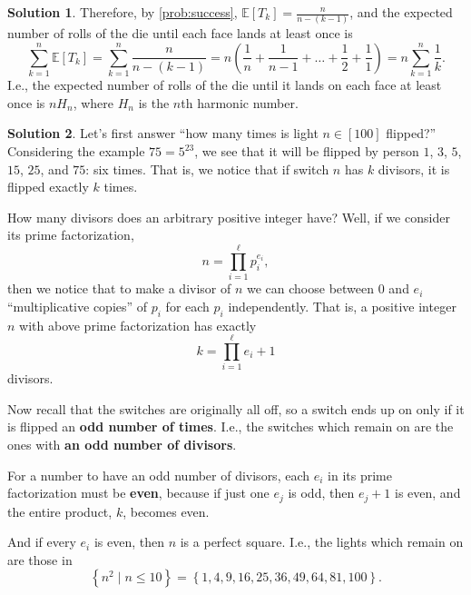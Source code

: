 \documentclass{article}
\theoremstyle{definition}
\newtheorem{sol}{Solution}
\theoremstyle{plain}
\newcommand{\set}[1]{\left\{#1\right\}}
\newcommand{\Exp}[1]{\mathbb{E}\left[#1\right]}
\begin{document}
\begin{sol}
Therefore, by \eqref{prob:success}, $\Exp{T_k} = \frac{n}{n-(k-1)}$, and the expected number of rolls of the die until each face lands at least once is
\[
\sum_{k=1}^{n}\Exp{T_k} = \sum_{k=1}^{n}\frac{n}{n-(k-1)} = n\left(\frac{1}{n} + \frac{1}{n-1} + \dots + \frac{1}{2} + \frac{1}{1}\right) = n\sum_{k=1}^n\frac{1}{k}.
\]
I.e., the expected number of rolls of the die until it lands on each face at least once is $nH_n$, where $H_n$ is the $n$th harmonic number.
\end{sol}

\begin{sol}
Let's first answer ``how many times is light $n \in [100]$ flipped?'' Considering the example $75=5^23$, we see that it will be flipped by person $1$, $3$, $5$, $15$, $25$, and $75$: six times. That is, we notice that if switch $n$ has $k$ divisors, it is flipped exactly $k$ times.

How many divisors does an arbitrary positive integer have? Well, if we consider its prime factorization,
\[
n = \prod_{i = 1}^{\ell}p_i^{e_i},
\]
then we notice that to make a divisor of $n$ we can choose between $0$ and $e_i$ ``multiplicative copies'' of $p_i$ for each $p_i$ independently. That is, a positive integer $n$ with above prime factorization has exactly
\[
k = \prod_{i=1}^{\ell}e_i+1
\]
divisors.

Now recall that the switches are originally all off, so a switch ends up on only if it is flipped an \textbf{odd number of times}. I.e., the switches which remain on are the ones with \textbf{an odd number of divisors}.

For a number to have an odd number of divisors, each $e_i$ in its prime factorization must be \textbf{even}, because if just one $e_j$ is odd, then $e_j+1$ is even, and the entire product, $k$, becomes even.

And if every $e_i$ is even, then $n$ is a perfect square. I.e., the lights which remain on are those in
\[
\set{n^2 \mid n \le 10} = \set{1, 4, 9, 16, 25, 36, 49, 64, 81, 100}.
\]
\end{sol}
\end{document}
